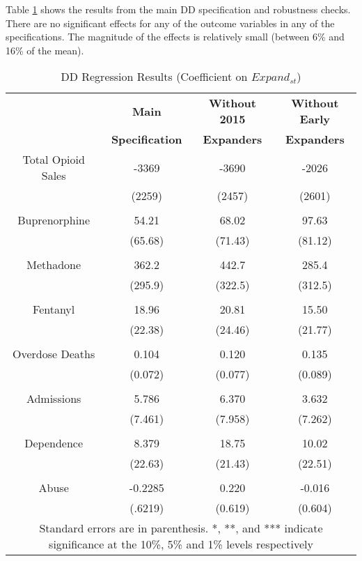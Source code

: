 \documentclass[11pt]{article}
\begin{document}
  
  \cleardoublepage
  


 
Table \ref{DD1} shows the results from the main DD specification and robustness checks.  There are no significant effects for any of the outcome variables in any of the specifications. The magnitude of the effects is relatively small (between 6\% and 16\% of the mean).
 
 
\begin{table}[!h]
\centering
\caption{DD Regression Results (Coefficient on $Expand_{st}$)}
\label{DD1}
\begin{tabular}{cccc}
\hline
\textbf{} &
\textbf{Main} & \textbf{Without 2015} & {\textbf{Without Early}}  \\ 
& \textbf{Specification} & \textbf{Expanders} & {\textbf{Expanders}}  \\ \hline
Total Opioid Sales & -3369 & -3690 & -2026 \\
                           & (2259) & (2457) & (2601)\\  
& & & \\   
Buprenorphine & 54.21 & 68.02 & 97.63 \\
                      & (65.68) & (71.43) & (81.12) \\ 
& & & \\
Methadone & 362.2 & 442.7  & 285.4\\
                 & (295.9) & (322.5) & (312.5) \\ 
& & & \\
Fentanyl & 18.96 & 20.81  &  15.50\\
              & (22.38) & (24.46) & (21.77) \\ 

& & & \\
Overdose Deaths & 0.104 & 0.120 & 0.135  \\ 
                          & (0.072) & (0.077) & (0.089) \\ 
& & & \\
Admissions & 5.786 & 6.370 & 3.632  \\
                 & (7.461) & (7.958) & (7.262)\\ 
& & & \\
Dependence & 8.379 & 18.75 & 10.02\\
                   & (22.63) & (21.43) & (22.51)\\ 
& & & \\
Abuse &-0.2285 & 0.220 & -0.016\\
           & (.6219) & (0.619) & (0.604)\\ 
\hline
 \multicolumn{4}{c}{\tiny{Standard errors are in parenthesis.  *, **, and *** indicate significance at the 10\%, 5\% and 1\% levels respectively}} \\
\hline
\end{tabular}
\end{table}
\end{document}
